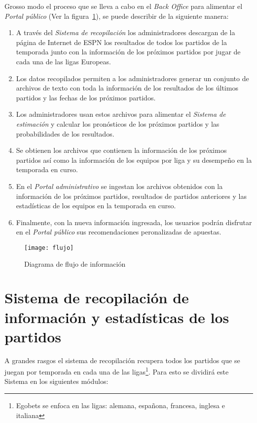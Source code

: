 Grosso modo el proceso que se lleva a cabo en el \emph{Back Office} para alimentar el \emph{Portal público} (Ver la figura~\ref{Fig:flujo}), se puede describir de la siguiente manera:
\begin{enumerate}
	\item A través del \emph{Sistema de recopilación} los administradores descargan de la página de Internet de ESPN los resultados de todos los partidos de la temporada junto con la información de los próximos partidos por jugar  de cada una de las ligas Europeas.
	\item Los datos recopilados permiten a los administradores generar un conjunto de archivos de texto con toda la información de los resultados de los últimos partidos y las fechas de los próximos partidos.
	\item Los administradores usan estos archivos para alimentar el \emph{Sistema de estimación} y calcular los pronósticos de los próximos partidos y las probabilidades de los resultados.
	\item Se obtienen los archivos que contienen la información de los próximos partidos así como la información de los equipos por liga y su desempeño en la temporada en curso.
	\item En el \emph{Portal administrativo} se ingestan los archivos obtenidos con la información de los próximos partidos, resultados de partidos anteriores y las estadísticas de los equipos en la temporada en curso.
	\item Finalmente, con la nueva información ingresada, los usuarios podrán disfrutar en el \emph{Portal público} sus recomendaciones peronalizadas de apuestas.
\end{enumerate}

\begin{figure}[!htb]\centering
   \begin {minipage}{1\textwidth}
     \texttt{[image: flujo]}
     \caption{Diagrama de flujo de información}\label{Fig:flujo}
   \end{minipage}
\end{figure}

\section{Sistema de recopilación de información y estadísticas de los partidos}
\graphicspath{{/Users/brunomedina/Dropbox/Tesis-Egobets/egobets-notas/resources/recopilador/}}

A grandes rasgos el sistema de recopilación recupera todos los partidos que se juegan por temporada en cada una de las ligas\footnote{Egobets se enfoca en las ligas: alemana, españona, francesa, inglesa e italiana}. Para esto se dividirá este Sistema en los siguientes módulos:

